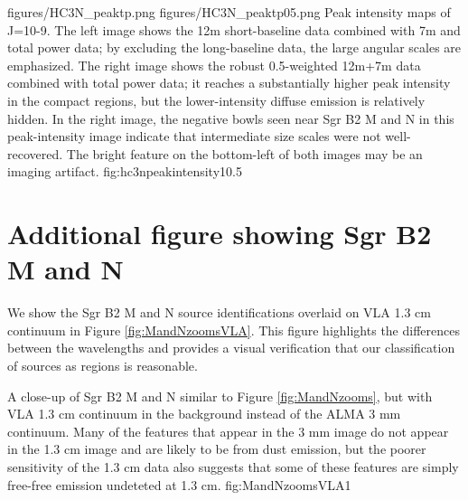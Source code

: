 \documentclass[twocolumn]{aastex61}
\begin{document}
\FigureTwo
{figures/HC3N_peaktp.png}
{figures/HC3N_peaktp05.png}
{Peak intensity maps of \cyanoacetylene J=10-9.
The left image shows the 12m short-baseline data combined with 7m and total
power data; by excluding the long-baseline data, the large angular scales are
emphasized.  The right image shows the robust 0.5-weighted 12m+7m data combined
with total power data;
it reaches a substantially higher peak intensity in the compact regions, but
the lower-intensity diffuse emission is relatively hidden.  In the right image,
the negative bowls seen near Sgr B2 M and N in this peak-intensity image
indicate that intermediate size scales were not well-recovered.  The bright
feature on the bottom-left of both images may be an imaging artifact.}
{fig:hc3npeakintensity}{1}{0.5\textwidth}

\section{Additional figure showing Sgr B2 M and N}
\label{sec:onept3cm}
We show the Sgr B2 M and N source identifications overlaid on VLA 1.3 cm
continuum \citep{De-Pree2014a} in Figure \ref{fig:MandNzoomsVLA}.  This figure
highlights the differences between the wavelengths and provides a visual
verification that our classification of sources as \hii regions is reasonable.

{A close-up of Sgr B2 M and N similar to Figure \ref{fig:MandNzooms}, but with
VLA 1.3 cm continuum \citep{De-Pree2014a} in the background instead of the ALMA 3 mm
continuum.  Many of the features that appear in the 3 mm image do not appear
in the 1.3 cm image and are likely to be from dust emission, but the poorer sensitivity
of the 1.3 cm data also suggests that some of these features are simply 
free-free emission undeteted at 1.3 cm.}
{fig:MandNzoomsVLA}{1}{\textwidth}
\end{document}
